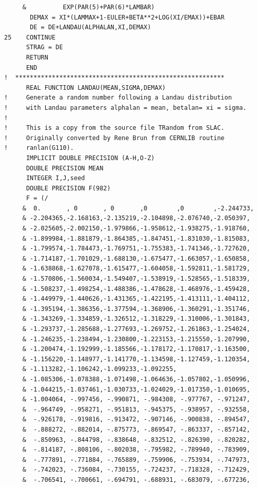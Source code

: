 \begin{lstlisting}
     &          EXP(PAR(5)+PAR(6)*LAMBAR)
       DEMAX = XI*(LAMMAX+1-EULER+BETA**2+LOG(XI/EMAX))+EBAR       
       DE = DE+LANDAU(ALPHALAN,XI,DEMAX)
25    CONTINUE
      STRAG = DE
      RETURN
      END
!  *********************************************************
      REAL FUNCTION LANDAU(MEAN,SIGMA,DEMAX)
!     Generate a random number following a Landau distribution
!     with Landau parameters alphalan = mean, betalan= xi = sigma.
!
!     This is a copy from the source file TRandom from SLAC.
!     Originally converted by Rene Brun from CERNLIB routine 
!     ranlan(G110).
      IMPLICIT DOUBLE PRECISION (A-H,O-Z)
      DOUBLE PRECISION MEAN
      INTEGER I,J,seed
      DOUBLE PRECISION F(982)
      F = (/
     &  0.       , 0       , 0       ,0        ,0        ,-2.244733,
     & -2.204365,-2.168163,-2.135219,-2.104898,-2.076740,-2.050397,
     & -2.025605,-2.002150,-1.979866,-1.958612,-1.938275,-1.918760,
     & -1.899984,-1.881879,-1.864385,-1.847451,-1.831030,-1.815083,
     & -1.799574,-1.784473,-1.769751,-1.755383,-1.741346,-1.727620,
     & -1.714187,-1.701029,-1.688130,-1.675477,-1.663057,-1.650858,
     & -1.638868,-1.627078,-1.615477,-1.604058,-1.592811,-1.581729,
     & -1.570806,-1.560034,-1.549407,-1.538919,-1.528565,-1.518339,
     & -1.508237,-1.498254,-1.488386,-1.478628,-1.468976,-1.459428,
     & -1.449979,-1.440626,-1.431365,-1.422195,-1.413111,-1.404112,
     & -1.395194,-1.386356,-1.377594,-1.368906,-1.360291,-1.351746,
     & -1.343269,-1.334859,-1.326512,-1.318229,-1.310006,-1.301843,
     & -1.293737,-1.285688,-1.277693,-1.269752,-1.261863,-1.254024,
     & -1.246235,-1.238494,-1.230800,-1.223153,-1.215550,-1.207990,
     & -1.200474,-1.192999,-1.185566,-1.178172,-1.170817,-1.163500,
     & -1.156220,-1.148977,-1.141770,-1.134598,-1.127459,-1.120354,
     & -1.113282,-1.106242,-1.099233,-1.092255,
     & -1.085306,-1.078388,-1.071498,-1.064636,-1.057802,-1.050996,
     & -1.044215,-1.037461,-1.030733,-1.024029,-1.017350,-1.010695,
     & -1.004064, -.997456, -.990871, -.984308, -.977767, -.971247,
     &  -.964749, -.958271, -.951813, -.945375, -.938957, -.932558,
     &  -.926178, -.919816, -.913472, -.907146, -.900838, -.894547,
     &  -.888272, -.882014, -.875773, -.869547, -.863337, -.857142,
     &  -.850963, -.844798, -.838648, -.832512, -.826390, -.820282,
     &  -.814187, -.808106, -.802038, -.795982, -.789940, -.783909,
     &  -.777891, -.771884, -.765889, -.759906, -.753934, -.747973,
     &  -.742023, -.736084, -.730155, -.724237, -.718328, -.712429,
     &  -.706541, -.700661, -.694791, -.688931, -.683079, -.677236,

\end{lstlisting}
